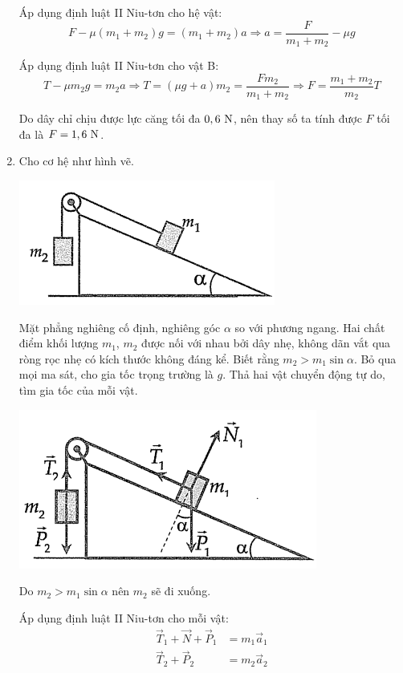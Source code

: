 \begin{enumerate}[label=\bfseries Câu \arabic*:]
{		Áp dụng định luật II Niu-tơn cho hệ vật:
		\[F-\mu (m_1 + m_2)g=(m_1+m_2)a \Rightarrow a = \dfrac{F}{m_1 + m_2} - \mu g\]
		
		Áp dụng định luật II Niu-tơn cho vật B:
		\[T-\mu m_2g=m_2 a \Rightarrow T = (\mu g + a)m_2 = \dfrac{F m_2}{m_1 + m_2} \Rightarrow F = \dfrac{m_1 + m_2}{m_2}T\]
		
		Do dây chỉ chịu được lực căng tối đa $0,6\ \text N$, nên thay số ta tính được $F$ tối đa là $F=1,6\ \text N$.
	}
	\item {}
	
	
	{Cho cơ hệ như hình vẽ.
		\begin{center}
			\includegraphics[scale=0.8]{../figs/VN10-2021-PH-TP012-3.png}
		\end{center}
		Mặt phẳng nghiêng cố định, nghiêng góc $\alpha$ so với phương ngang. Hai chất điểm khối lượng $m_1$, $m_2$ được nối với nhau bởi dây nhẹ, không dãn vắt qua ròng rọc nhẹ có kích thước không đáng kể. Biết rằng $m_2 > m_1 \sin \alpha$. Bỏ qua mọi ma sát, cho gia tốc trọng trường là $g$. Thả hai vật chuyển động tự do, tìm gia tốc của mỗi vật.
	}
	
	\hideall
	{	\begin{center}
			\includegraphics[scale=0.8]{../figs/VN10-2021-PH-TP012-4.png}
		\end{center}
		
		Do $m_2 > m_1 \sin \alpha$ nên $m_2$ sẽ đi xuống.
		
		Áp dụng định luật II Niu-tơn cho mỗi vật:
		\begin{align*}
			\vec T_1 + \vec N + \vec P_1 &= m_1 \vec a_1 \\
			\vec T_2 + \vec P_2 &= m_2 \vec a_2
		\end{align*}
		
}
\end{enumerate}
